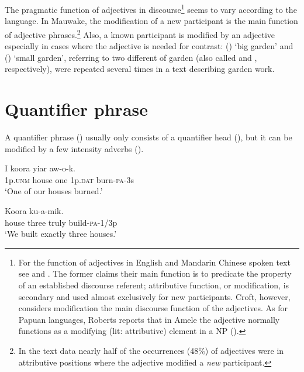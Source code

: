 The pragmatic function of adjectives in discourse\footnote{For the function of adjectives in English and Mandarin Chinese spoken text see \citet{Thompson1988} and \citet{Croft1991}. The former claims their main function is to predicate the property of an established discourse referent; attributive function, or modification, is secondary and used almost exclusively for new participants. Croft, however, considers modification the main discourse function of the adjectives.  As for Papuan languages, Roberts reports that in Amele the adjective normally functions as a modifying (lit: attributive) element in a NP (\citeyear[318]{Roberts1987}).} seems to vary according to the language. In Mauwake, the modification of a new participant is the main function of adjective phrases.\footnote{In the text data nearly half of the occurrences (48\%) of adjectives were in attributive positions where the adjective modified a \textit{new} participant.} Also, a known participant is modified by an adjective especially in cases where the adjective is needed for contrast: ()  `big garden' and () \textstyleEmphasizedWords{} `small garden', referring to two different  of garden (also called  and , respectively), were repeated several times in a text describing garden work. 

\section{Quantifier phrase} \label{sec:4.3}
{}
A quantifier phrase () usually only consists of a quantifier head  (), but it can be modified by a few intensity adverbs  (). 

\ea%
\label{ex:4:x845}
\gll I  koora    yiar  aw-o-k. \\
    1p.\textsc{unm}  house  one  1p.\textsc{dat}  burn-\textsc{pa}-3s  \\
\glt`One of our houses burned.'
\z

\ea%
\label{ex:4:x844}
\gll Koora     ku-a-mik. \\
   house  three  truly  build-\textsc{pa}-1/3p   \\
\glt`We built exactly three houses.'
\z

